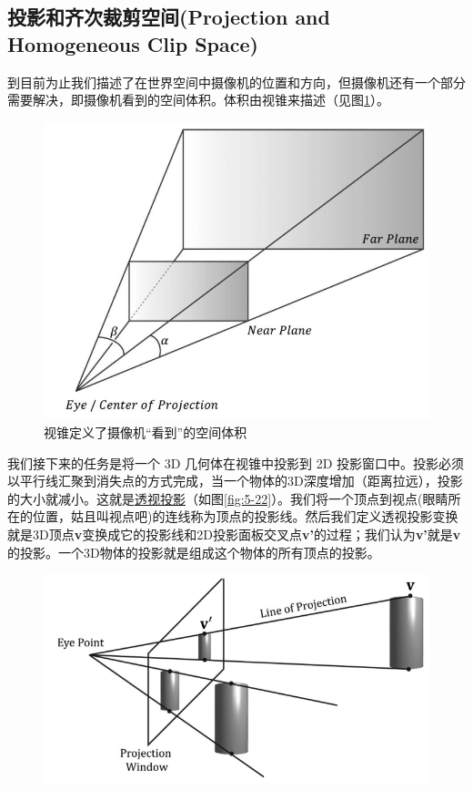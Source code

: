 \documentclass[11pt,a4paper,oldfontcommands]{memoir}
\begin{document}
{\subsection{投影和齐次裁剪空间(Projection and Homogeneous Clip Space)}
\begin{flushleft}
到目前为止我们描述了在世界空间中摄像机的位置和方向，但摄像机还有一个部分需要解决，即摄像机看到的空间体积。体积由视锥来描述（见图\ref{fig:5-21}）。
\end{flushleft}
\begin{figure}[t]
    \includegraphics[width=\textwidth]{5-21}
    \centering
    \caption{视锥定义了摄像机“看到”的空间体积}
    \label{fig:5-21}
\end{figure}
\begin{flushleft}
我们接下来的任务是将一个 3D 几何体在视锥中投影到 2D 投影窗口中。投影必须以平行线汇聚到消失点的方式完成，当一个物体的3D深度增加（距离拉远），投影的大小就减小。这就是\href{https://en.wikipedia.org/wiki/Perspective_(graphical)}{\textcolor{linkColor}{透视投影}}（如图\ref{fig:5-22}）。我们将一个顶点到视点(眼睛所在的位置，姑且叫视点吧)的连线称为顶点的投影线。然后我们定义透视投影变换就是3D顶点\textbf{v}变换成它的投影线和2D投影面板交叉点\textbf{v'}的过程；我们认为\textbf{v'}就是\textbf{v}的投影。一个3D物体的投影就是组成这个物体的所有顶点的投影。
\end{flushleft}
\begin{figure}[t]
    \includegraphics[width=\textwidth]{5-22}

\end{figure}}
\end{document}
